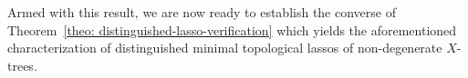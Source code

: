 %
%
%
%
Armed with this result, we are now ready to establish the converse of
Theorem~\ref{theo: distinguished-lasso-verification} which yields the
aforementioned characterization of distinguished minimal topological lassos of
non-degenerate $X$-trees.

